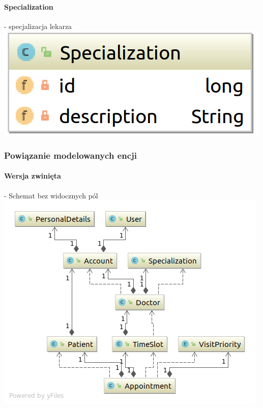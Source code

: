 \documentclass[polish,12pt]{aghthesis}
\begin{document}
    \paragraph{Specialization} - specjalizacja lekarza \\
    \includegraphics[width=\textwidth]{Specialization}
\subsubsection{Powiązanie modelowanych encji}
\paragraph{Wersja zwinięta} - Schemat bez widocznych pól\\
\includegraphics[width=\textwidth]{java-entities-small}
\end{document}
